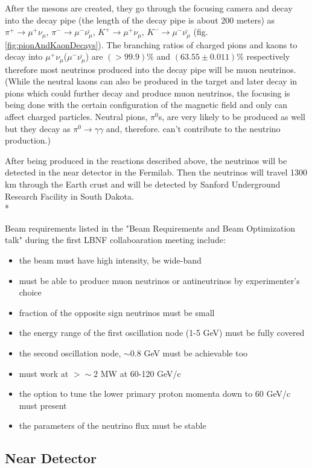 After the mesons are created, they go through the focusing camera and decay into the decay pipe (the length of the decay pipe is about 200 meters) as $\pi^+ \rightarrow \mu^+\nu_\mu$, $\pi^- \rightarrow \mu^-\bar{\nu_\mu}$, $K^+ \rightarrow \mu^+\nu_\mu$, $K^- \rightarrow \mu^-\bar{\nu_\mu}$ (fig. \ref{fig:pionAndKaonDecays}). The branching ratios of charged pions and kaons to decay into $\mu^+\nu_\mu$($\mu^-\bar{\nu_\mu}$) are $(>99.9)\%$ and $(63.55\pm0.011)\%$ respectively therefore most neutrinos produced into the decay pipe will be muon neutrinos. (While the neutral kaons can also be produced in the target and later decay in pions which could further decay and produce muon neutrinos, the focusing is being done with the certain configuration of the magnetic field and only can affect charged particles. Neutral pions, $\pi^0$s, are very likely to be produced as well but they decay as $\pi^0 \rightarrow \gamma\gamma$ and, therefore. can't contribute to the neutrino production.)

After being produced in the reactions described above, the neutrinos will be detected in the near detector in the Fermilab. Then the neutrinos will travel 1300 km through the Earth crust and will be detected by Sanford Underground Research Facility in South Dakota.\\*  

Beam requirements listed in the "Beam Requirements and Beam Optimization talk" during the first LBNF collaboaration meeting include:
\begin{itemize}
  \item the beam must have high intensity, be wide-band
  \item must be able to produce muon neutrinos or antineutrinos by experimenter's choice
  \item fraction of the opposite sign neutrinos must be small
  \item the energy range of the first oscillation node (1-5 GeV) must be fully covered
  \item the second oscillation node, $\sim{0.8}$ GeV must be achievable too
  \item must work at $>\sim{2} $ MW at 60-120 GeV/c
  \item the option to tune the lower primary proton momenta down to 60 GeV/c must present
  \item the parameters of the neutrino flux must be stable
\end{itemize}

\subsection{Near Detector}


